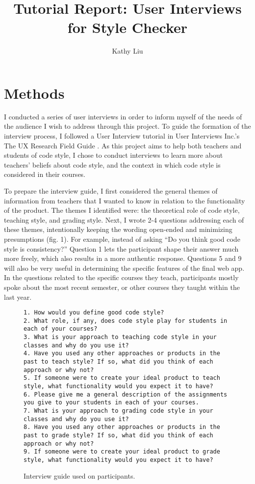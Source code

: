 \documentclass[10pt,twocolumn]{article}
\title{Tutorial Report: User Interviews for Style Checker}
\author{Kathy Liu}
\affiliation{Occidental College}
\begin{document}
\maketitle

\section{Methods}
I conducted a series of user interviews in order to inform myself of the needs of the audience I wish to address through this project. To guide the formation of the interview process, I followed a User Interview tutorial in User Interviews Inc.’s The UX Research Field Guide \cite{interview_tutorial}. As this project aims to help both teachers and students of code style, I chose to conduct interviews to learn more about teachers’ beliefs about code style, and the context in which code style is considered in their courses. 

To prepare the interview guide, I first considered the general themes of information from teachers that I wanted to know in relation to the functionality of the product. The themes I identified were: the theoretical role of code style, teaching style, and grading style. Next, I wrote 2-4 questions addressing each of these themes, intentionally keeping the wording open-ended and minimizing presumptions (fig. 1). For example, instead of asking “Do you think good code style is consistency?” Question 1 lets the participant shape their answer much more freely, which also results in a more authentic response. Questions 5 and 9 will also be very useful in determining the specific features of the final web app. In the questions related to the specific courses they teach, participants mostly spoke about the most recent semester, or other courses they taught within the last year. 

\begin{figure}
\begin{lstlisting}
1. How would you define good code style?
2. What role, if any, does code style play for students in each of your courses?
3. What is your approach to teaching code style in your classes and why do you use it?
4. Have you used any other approaches or products in the past to teach style? If so, what did you think of each approach or why not?
5. If someone were to create your ideal product to teach style, what functionality would you expect it to have?
6. Please give me a general description of the assignments you give to your students in each of your courses.
7. What is your approach to grading code style in your classes and why do you use it?
8. Have you used any other approaches or products in the past to grade style? If so, what did you think of each approach or why not?
9. If someone were to create your ideal product to grade style, what functionality would you expect it to have?
\end{lstlisting}
\vspace{7 mm}
	\centering
	\caption{Interview guide used on participants.}
\end{figure}
\end{document}
